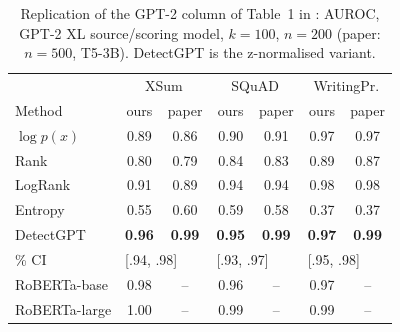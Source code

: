 \documentclass[11pt]{article}
\begin{document}
\begin{table}[t]
\centering\small
\setlength{\tabcolsep}{3.5pt}
\begin{tabular}{lcccccc}
\toprule
 & \multicolumn{2}{c}{XSum} & \multicolumn{2}{c}{SQuAD} & \multicolumn{2}{c}{WritingPr.} \\
Method & ours & paper & ours & paper & ours & paper \\
\midrule
$\log p(x)$ & 0.89 & 0.86 & 0.90 & 0.91 & 0.97 & 0.97 \\
Rank        & 0.80 & 0.79 & 0.84 & 0.83 & 0.89 & 0.87 \\
LogRank     & 0.91 & 0.89 & 0.94 & 0.94 & 0.98 & 0.98 \\
Entropy     & 0.55 & 0.60 & 0.59 & 0.58 & 0.37 & 0.37 \\
DetectGPT   & \textbf{0.96} & \textbf{0.99} & \textbf{0.95} & \textbf{0.99} & \textbf{0.97} & \textbf{0.99} \\
\quad 95\% CI & \multicolumn{2}{l}{[.94, .98]} & \multicolumn{2}{l}{[.93, .97]} & \multicolumn{2}{l}{[.95, .98]}\\
\midrule
RoBERTa-base  & 0.98 & -- & 0.96 & -- & 0.97 & -- \\
RoBERTa-large & 1.00 & -- & 0.99 & -- & 0.99 & -- \\
\bottomrule
\end{tabular}
\caption{Replication of the GPT-2 column of Table~1 in \citet{mitchell2023detectgpt}: AUROC, GPT-2 XL source/scoring model, $k=100$, $n=200$ (paper: $n=500$, T5-3B). DetectGPT is the z-normalised variant.}
\label{tab:replication}
\end{table}

\begin{table}[t]
\centering\small
\setlength{\tabcolsep}{3.5pt}
\caption{Domain-shift datasets ($n=200$, $k=100$). PubMedQA: GPT-2 XL + T5-large; WMT16: mGPT + mT5-large (paper: mT5-XL). Paper values are from Fig.~4 where an exact value can be read; WMT16-en is shown there only as a bar.}
\label{tab:shift}
\end{table}
\end{document}
